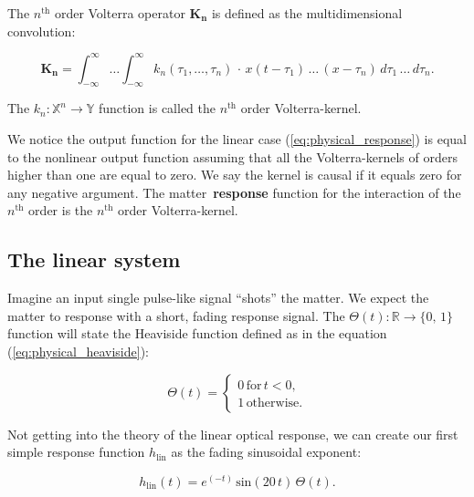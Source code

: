 \documentclass[12pt,twoside,a4paper]{article}
\numberwithin{equation}{subsection}
\numberwithin{figure}{subsection}
\begin{document}
The $ n ^ {\text{th}} $ order Volterra operator $ \mathbf{K_n} $ is defined as the multidimensional convolution:

\begin{equation} \label{eq:physical_volterraoperator}
  \mathbf{K_n} = \int_{ - \infty}^{\infty} \ldots \int_{ - \infty}^{\infty} k_n (\tau_1, \ldots, \tau_n) \, \cdot \, x(t - \tau_1) \, \ldots
  \, (x - \tau_n)\, d\tau_1 \, \ldots \, d\tau_n .
\end{equation}

The $ k_n : \mathbb{X}^{n} \rightarrow \mathbb{Y} $ function is called the $ n ^ {\text{th}} $ order Volterra-kernel. 

We notice the output function for the linear case (\ref{eq:physical_response}) is equal to the nonlinear output function assuming that all the Volterra-kernels of orders higher than one are equal to zero. We say the kernel is causal if it equals zero for any negative argument. The matter~\textbf{response} function for the interaction of the $ n^{\text{th}} $ order is the $ n^{\text{th}} $ order Volterra-kernel.

\subsection{The linear system} \label{chap:physical_linearsystem}

Imagine an input single pulse-like signal ``shots'' the matter. We expect the matter to response with a short, fading response signal. The $ \Theta (t) : \mathbb{R} \rightarrow \{0, \, 1 \} $ function will state the Heaviside function defined as in the equation (\ref{eq:physical_heaviside}):

\begin{equation} \label{eq:physical_heaviside}
   \Theta(t)  =  
   \begin{cases}
     0 \, \text{for} \, t < 0, \\
     1 \, \text{otherwise}.
   \end{cases}
\end{equation}

Not getting into the theory of the linear optical response, we can create our first simple response function $ h_{\text{lin}} $ as the fading sinusoidal exponent:

\begin{equation} \label{eq:physical_linear_response}
  h_{\text{lin}} (t) = e^{( - t)}\,\mathrm{sin}(20\,t)\,\Theta (t) .
\end{equation}
\end{document}
